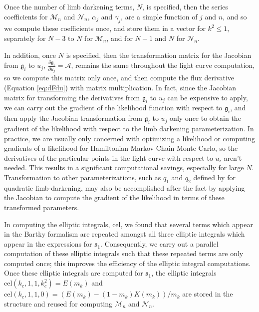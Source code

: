 \documentclass[modern,trackchanges]{aastex63}
\begin{document}
Once the number of limb darkening
terms, $N$, is specified, then the series coefficients for $\mathcal{M}_n$
and $\mathcal{N}_n$, $\alpha_j$ and $\gamma_j$, are a simple function of $j$
and $n$, and so we compute these coefficients once, and store them in a vector
for $k^2 \le 1$, separately for $N-3$ to $N$ for $\mathcal{M}_n$, and for
$N-1$ and $N$ for $\mathcal{N}_n$.

In addition, once $N$ is specified, then the transformation matrix for
the Jacobian from $\mathfrak{g}_i$ to $u_j$, $\frac{\partial \mathfrak{g}_i}{\partial u_j}=\mathcal{A}$,
remains the same throughout the light curve
computation, so we compute this matrix only once, and then compute the
flux derivative (Equation \ref{eq:dFdu}) with matrix multiplication.
In fact, since the Jacobian matrix for transforming the derivatives from $\mathfrak{g}_i$
to $u_j$ can be expensive to apply, we can carry out the gradient of the
likelihood function with respect to $\mathfrak{g}_i$, and then apply the Jacobian
transformation from $\mathfrak{g}_i$ to $u_j$ only once to obtain the gradient
of the likelihood with respect to the limb darkening parameterization.
In practice, we are usually only concerned with optimizing a likelihood
or computing gradients of a likelihood for Hamiltonian Markov Chain
Monte Carlo, so the derivatives of the particular points in the
light curve with respect to $u_i$ aren't needed.  This results in a
significant computational savings, especially for large $N$.
Transformation to other parameterizations, such as $q_1$ and $q_2$
defined by \citet{Kipping2013} for quadratic limb-darkening, may also be accomplished after the
fact by applying the Jacobian to compute the gradient of the likelihood
in terms of these transformed parameters.

In computing the elliptic integrals, cel, we found that several terms
which appear in the Bartky formalism are repeated amongst all three elliptic
integrals which appear in the expressions for $\mathfrak{s}_1$.  Consequently, we carry
out a parallel computation of these elliptic integrals such that these
repeated terms are only computed once;  this improves the efficiency of
the elliptic integral computations.  Once these elliptic integrals
are computed for $\mathfrak{s}_1$, the elliptic integrals $\mathrm{cel}(k_c,1,1,k_c^2)=E(m_k)$
and $\mathrm{cel}(k_c,1,1,0)=(E(m_k)-(1-m_k)K(m_k))/m_k $ are
stored in the structure and reused for computing $\mathcal{M}_n$
and $\mathcal{N}_n$.

\end{document}
